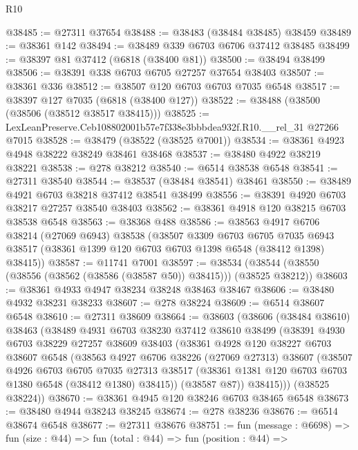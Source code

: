 \begin{lexlean}{R10}
\begin{coremodule}
@38485 := @27311 @37654
@38488 := @38483 (@38484 @38485) @38459
@38489 := @38361 @142
@38494 := @38489 @339 @6703 @6706 @37412 @38485
@38499 := @38397 @81 @37412 (@6818 (@38400 @81))
@38500 := @38494 @38499
@38506 := @38391 @338 @6703 @6705 @27257 @37654 @38403
@38507 := @38361 @336
@38512 := @38507 @120 @6703 @6703 @7035 @6548
@38517 := @38397 @127 @7035 (@6818 (@38400 @127))
@38522 := @38488 (@38500 (@38506 (@38512 @38517 @38415)))
@38525 := LexLeanPreserve.Ceb108802001b57e7f338e3bbbdea932f.R10.__rel_31 @27266 @7015
@38528 := @38479 (@38522 (@38525 @7001))
@38534 := @38361 @4923 @4948 @38222 @38249 @38461 @38468
@38537 := @38480 @4922 @38219 @38221
@38538 := @278 @38212
@38540 := @6514 @38538 @6548
@38541 := @27311 @38540
@38544 := @38537 (@38484 @38541) @38461
@38550 := @38489 @4921 @6703 @38218 @37412 @38541 @38499
@38556 := @38391 @4920 @6703 @38217 @27257 @38540 @38403
@38562 := @38361 @4918 @120 @38215 @6703 @38538 @6548
@38563 := @38368 @488
@38586 := @38563
    @4917
    @6706
    @38214
    (@27069 @6943)
    @38538
    (@38507
      @3309
      @6703
      @6705
      @7035
      @6943
      @38517
      (@38361 @1399 @120 @6703 @6703 @1398 @6548 (@38412 @1398) @38415))
@38587 := @11741 @7001
@38597 := @38534 (@38544 (@38550 (@38556 (@38562 (@38586 (@38587 @50)) @38415))) (@38525 @38212))
@38603 := @38361 @4933 @4947 @38234 @38248 @38463 @38467
@38606 := @38480 @4932 @38231 @38233
@38607 := @278 @38224
@38609 := @6514 @38607 @6548
@38610 := @27311 @38609
@38664 := @38603
    (@38606
      (@38484 @38610)
      @38463
      (@38489
        @4931
        @6703
        @38230
        @37412
        @38610
        @38499
        (@38391
          @4930
          @6703
          @38229
          @27257
          @38609
          @38403
          (@38361
            @4928
            @120
            @38227
            @6703
            @38607
            @6548
            (@38563
              @4927
              @6706
              @38226
              (@27069 @27313)
              @38607
              (@38507
                @4926
                @6703
                @6705
                @7035
                @27313
                @38517
                (@38361 @1381 @120 @6703 @6703 @1380 @6548 (@38412 @1380) @38415))
              (@38587 @87))
            @38415)))
      (@38525 @38224))
@38670 := @38361 @4945 @120 @38246 @6703 @38465 @6548
@38673 := @38480 @4944 @38243 @38245
@38674 := @278 @38236
@38676 := @6514 @38674 @6548
@38677 := @27311 @38676
@38751 := fun (message : @6698) =>
  fun (size : @44) =>
  fun (total : @44) =>
  fun (position : @44) =>

\end{coremodule}
\end{lexlean}
